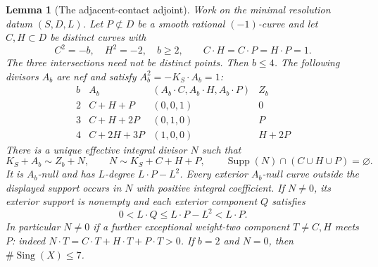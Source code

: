 \documentclass[11pt,reqno]{amsart}
\newtheorem{lemma}[lemma]{Lemma}
\theoremstyle{definition}
\theoremstyle{remark}
\DeclareMathOperator{\Sing}{Sing}
\numberwithin{equation}{section}
\begin{document}
\begin{lemma}[The adjacent-contact adjoint]
\label{lem:adjacent-contact-adjoint}
Work on the minimal resolution datum $(S,D,L)$.
Let $P\not\subset D$ be a smooth rational $(-1)$-curve and let
$C,H\subset D$ be distinct curves with
\[
 C^2=-b,\quad H^2=-2,\quad b\ge2,\qquad
 C\cdot H=C\cdot P=H\cdot P=1.
\]
The three intersections need not be distinct points. Then $b\le4$.
The following divisors $A_b$ are nef and satisfy
$A_b^2=-K_S\cdot A_b=1$:
\[
\begin{array}{c|c|c|c}
 b&A_b&(A_b\cdot C,A_b\cdot H,A_b\cdot P)&Z_b\\\hline
 2&C+H+P&(0,0,1)&0\\
 3&C+H+2P&(0,1,0)&P\\
 4&C+2H+3P&(1,0,0)&H+2P
\end{array}
\]
There is a unique effective integral divisor $N$ such that
\[
 K_S+A_b\sim Z_b+N,\qquad N\sim K_S+C+H+P,
 \qquad \operatorname{Supp}(N)\cap(C\cup H\cup P)=\varnothing.
\]
It is $A_b$-null and has $L$-degree $L\cdot P-L^2$.
Every exterior $A_b$-null curve outside the displayed support
occurs in $N$ with positive integral coefficient. If $N\ne0$,
its exterior support is nonempty and each exterior component $Q$
satisfies
\[
 0<L\cdot Q\le L\cdot P-L^2<L\cdot P.
\]
In particular $N\ne0$ if a further exceptional weight-two component
$T\ne C,H$ meets $P$: indeed
$N\cdot T=C\cdot T+H\cdot T+P\cdot T>0$.
If $b=2$ and $N=0$, then $\#\Sing(X)\le7$.
\end{lemma}
\end{document}
